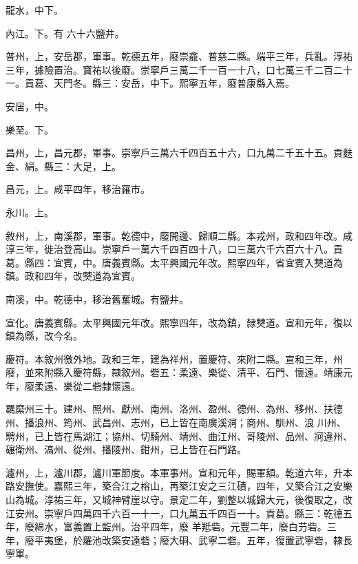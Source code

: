 \begin{pinyinscope}
 龍水，中下。



 內江。下。有
 六十六鹽井。



 普州，上，安岳郡，軍事。乾德五年，廢崇龕、普慈二縣。端平三年，兵亂。淳祐三年，據險置治。寶祐以後廢。崇寧戶三萬二千一百一十八，口七萬三千二百二十一。貢葛、天門冬。縣三：安岳，中下。熙寧五年，廢普康縣入焉。



 安居，中。



 樂至。下。



 昌州，上，昌元郡，軍事。崇寧戶三萬六千四百五十六，口九萬二千五十五。貢麩金、絹。縣三：大足，上。



 昌元，上。咸平四年，移治羅市。



 永川。上。



 敘州，上，南溪郡，軍事。乾德中，廢開邊、歸順二縣。本戎州，政和四年改。咸淳三年，徙治登高山。崇寧戶一萬六千四百四十八，口三萬六千六百六十八。貢葛。縣四：宜賓，中。唐義賓縣。太平興國元年改。熙寧四年，省宜賓入僰道為鎮。政和四年，改僰道為宜賓。



 南溪，中。乾德中，移治舊奮城。有鹽井。



 宣化。唐義賓縣。太平興國元年改。熙寧四年，改為鎮，隸僰道。宣和元年，復以鎮為縣，改今名。



 慶符。本敘州徼外地。政和三年，建為祥州，置慶符、來附二縣。宣和三年，州廢，並來附縣入慶符縣，隸敘州。砦五：柔遠、樂從、清平、石門、懷遠。靖康元年，廢柔遠、樂從二砦隸懷遠。



 羈縻州三十。建州、照州、獻州、南州、洛州、盈州、德州、為州、移州、扶德州、播浪州、筠州、武昌州、志州，已上皆在南廣溪洞；商州、馴州、浪
 川州、騁州，已上皆在馬湖江；協州、切騎州、靖州、曲江州、哥陵州、品州、牁違州、碾衛州、滈州、從州、播陵州、鉗州，已上皆在石門路。



 瀘州，上，瀘川郡，瀘川軍節度。本軍事州。宣和元年，賜軍額。乾道六年，升本路安撫使。嘉熙三年，築合江之榕山，再築江安之三江磧，四年，又築合江之安樂山為城。淳祐三年，又城神臂崖以守。景定二年，劉整以城歸大元，後復取之，改江安州。崇寧戶四萬四千六百一十一，口九萬五千四百一十。貢葛。縣三：乾德五年，廢綿水，富義置上監州。治平四年，廢
 羊羝砦。元豐二年，廢白芀砦。三年，廢平夷堡，於羅池改築安遠砦；廢大硐、武寧二砦。五年，復置武寧砦，隸長寧軍。




\end{pinyinscope}

